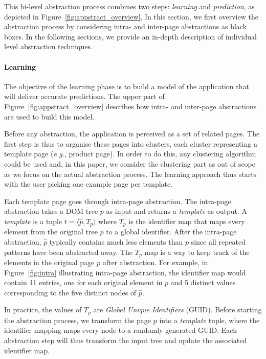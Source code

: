 This bi-level abstraction process combines two steps: \emph{learning} and \emph{prediction}, as depicted in Figure~\ref{fig:appstract_overview}.
% 
In this section, we first overview the abstraction process by considering intra- and inter-page abstractions as black boxes. 
In the following sections, we provide an in-depth description of individual level abstraction techniques.

\paragraph{Learning}
The objective of the learning phase is to build a model of the application that will deliver accurate predictions.
The upper part of Figure~\ref{fig:appstract_overview} describes how intra- and inter-page abstractions are used to build this model.

Before any abstraction, the application is perceived as a set of related pages.
The first step is thus to organise these pages into clusters, each cluster representing a template page (\emph{e.g.}, product page).
In order to do this, any clustering algorithm could be used and, in this paper, we consider the clustering part as out of scope as we focus on the actual abstraction process.
The learning approach thus starts with the user picking one example page per template.

Each template page goes through intra-page abstraction.
The intra-page abstraction takes a DOM tree $p$ as input and returns a \textit{template} as output.
A \textit{template} is a tuple $t = \langle \hat{p}, T_p \rangle$ where $T_p$ is the identifier map that maps every element from the original tree $p$ to a global identifier. After the intra-page abstraction, $\hat{p}$ typically contains much less elements than $p$ since all repeated patterns have been abstracted away.
The $T_p$ map is a way to keep track of the elements in the original page $p$ after abstraction.
For example, in Figure~\ref{fig:intra} illustrating intra-page abstraction, the identifier map would contain 11 entries, one for each original element in $p$ and 5 distinct values corresponding to the five distinct nodes of $\hat{p}$.

In practice, the values of $T_p$ are \emph{Global Unique Identifiers} (GUID).
Before starting the abstraction process, we transform the page $p$ into a \textit{template} tuple, where the identifier mapping maps every node to a randomly generated GUID.
Each abstraction step will thus transform the input tree and update the associated identifier map.

